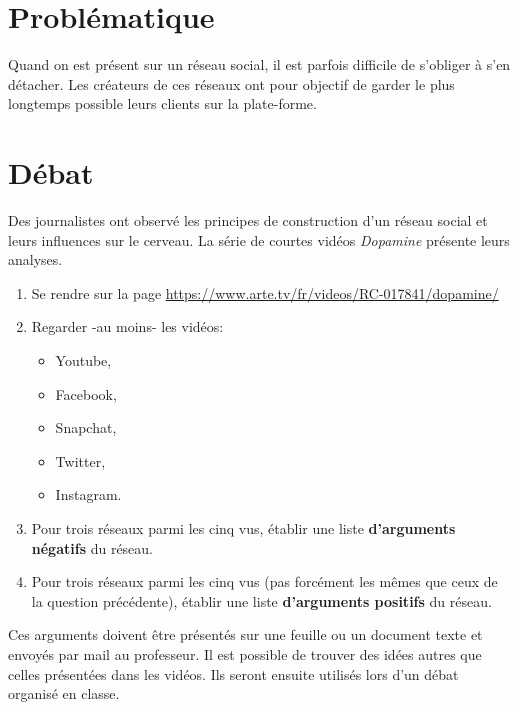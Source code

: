 \documentclass[a4paper,11pt]{article}
\begin{document}
\section{Problématique}
Quand on est présent sur un réseau social, il est parfois difficile de s'obliger à s'en détacher. Les créateurs de ces réseaux ont pour objectif de garder le plus longtemps possible leurs clients sur la plate-forme.
\begin{center}
\end{center}
\section{Débat}
Des journalistes ont observé les principes de construction d'un réseau social et leurs influences sur le cerveau. La série de courtes vidéos \emph{Dopamine} présente leurs analyses.
\begin{activite}
\begin{enumerate}
    \item Se rendre sur la page \url{https://www.arte.tv/fr/videos/RC-017841/dopamine/}
    \item Regarder -au moins- les vidéos:
    \begin{itemize}
        \item Youtube,
        \item Facebook,
        \item Snapchat,
        \item Twitter,
        \item Instagram.
    \end{itemize}
    \item Pour trois réseaux parmi les cinq vus, établir une liste \textbf{d'arguments négatifs} du réseau.
    \item Pour trois réseaux parmi les cinq vus (pas forcément les mêmes que ceux de la question précédente), établir une liste \textbf{d'arguments positifs} du réseau.
\end{enumerate}
Ces arguments doivent être présentés sur une feuille ou un document texte et envoyés par mail au professeur. Il est possible de trouver des idées autres que celles présentées dans les vidéos. Ils seront ensuite utilisés lors d'un débat organisé en classe.
\end{activite}
\end{document}
